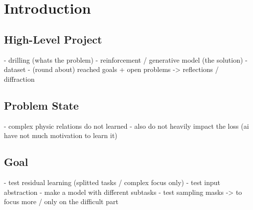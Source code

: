 \chapter{Introduction}
\label{cha:intro}

	
	
	\section{High-Level Project}
	\label{sec:intro-high_project}
		- drilling (whats the problem)
		- reinforcement / generative model (the solution)
		- dataset
		- (round about) reached goals + open problems -> reflections / diffraction
	
	\section{Problem State}
	\label{sec:intro-problem}
		- complex physic relations do not learned
		- also do not heavily impact the loss (ai have not much motivation to learn it)
		
	\section{Goal}
	\label{sec:intro-goal}
		- test residual learning (splitted tasks / complex focus only)
			- test input abstraction
			- make a model with different subtasks
		- test sampling masks -> to focus more / only on the difficult part